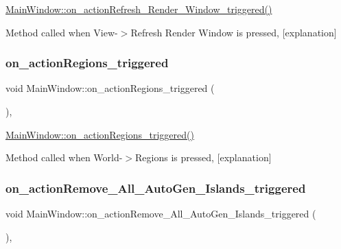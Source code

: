 \hyperlink{class_main_window_a52c7776d665150af7b2393ab3e72b8d6}{Main\+Window\+::on\+\_\+action\+Refresh\+\_\+\+Render\+\_\+\+Window\+\_\+triggered()} 

Method called when View-\/$>$Refresh Render Window is pressed, \mbox{[}explanation\mbox{]} \mbox{\label{class_main_window_a4eae54da532473a41d4047cddca1adba}} 
\subsubsection{\texorpdfstring{on\+\_\+action\+Regions\+\_\+triggered}{on\_actionRegions\_triggered}}
{\footnotesize\ttfamily void Main\+Window\+::on\+\_\+action\+Regions\+\_\+triggered (\begin{DoxyParamCaption}{ }\end{DoxyParamCaption})\hspace{0.3cm}{\ttfamily [private]}, {\ttfamily [slot]}}



\hyperlink{class_main_window_a4eae54da532473a41d4047cddca1adba}{Main\+Window\+::on\+\_\+action\+Regions\+\_\+triggered()} 

Method called when World-\/$>$Regions is pressed, \mbox{[}explanation\mbox{]} \mbox{\label{class_main_window_a184ce07aa200770c9862a049694e0ef0}} 
\subsubsection{\texorpdfstring{on\+\_\+action\+Remove\+\_\+\+All\+\_\+\+Auto\+Gen\+\_\+\+Islands\+\_\+triggered}{on\_actionRemove\_All\_AutoGen\_Islands\_triggered}}
{\footnotesize\ttfamily void Main\+Window\+::on\+\_\+action\+Remove\+\_\+\+All\+\_\+\+Auto\+Gen\+\_\+\+Islands\+\_\+triggered (\begin{DoxyParamCaption}{ }\end{DoxyParamCaption})\hspace{0.3cm}{\ttfamily [private]}, {\ttfamily [slot]}}



